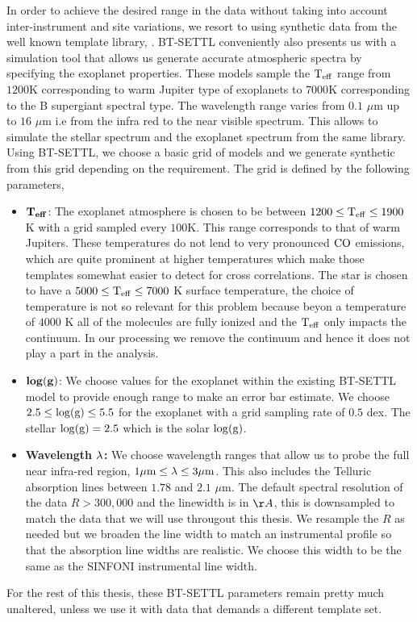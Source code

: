 In order to achieve the desired range in the data without taking into account inter-instrument and site variations, we resort to using synthetic data from the well known template library, \citep[\textsc{BT-SETTL},][]{1997Allard,2011Allard}.
\textsc{BT-SETTL} conveniently also presents us with a simulation tool \citep[\textsc{PHOENIX},][]{2011Allard} that allows us generate accurate atmospheric spectra by specifying the exoplanet properties.
These models sample the $\rm{T_{eff}}$ range from $1200$K corresponding to warm Jupiter type of exoplanets to $7000$K corresponding to the B supergiant spectral type.
The wavelength range varies from $0.1$ $\mu$m up to $16$ $\mu$m i.e from the infra red to the near visible spectrum. 
This allows to simulate the stellar spectrum and the exoplanet spectrum from the same library.
Using BT-SETTL, we choose a basic grid of models and we generate synthetic from this grid depending on the requirement.
The grid is defined by the following parameters,
\begin{itemize}
    \item[] $\rm{\mathbf{T_{eff}}}$: The exoplanet atmosphere is chosen to be between $1200\le \rm{T_{eff}}\le 1900$ K with a grid sampled every $100$K. 
    This range corresponds to that of warm Jupiters. 
    These temperatures do not lend to very pronounced $\rm{CO}$ emissions, which are quite prominent at higher temperatures which make those templates somewhat easier to detect for cross correlations. 
    The star is chosen to have a $5000\le \rm{T_{eff}}\le 7000$ K surface temperature, the choice of temperature is not so relevant for this problem because beyon a temperature of $4000$ K all of the molecules are fully ionized and the $\rm{T_{eff}}$ only impacts the continuum. 
    In our processing we remove the continuum and hence it does not play a part in the analysis.
    \item []$\rm{\mathbf{log(g)}}$: We choose values for the exoplanet within the existing BT-SETTL model to provide enough range to make an error bar estimate. 
    We choose $2.5\le \rm{\log(g)} \le 5.5$ for the exoplanet with a grid sampling rate of $0.5$ dex. 
    The stellar $\rm{\log(g)} = 2.5$ which is the solar $\rm{\log(g)}$.
    \item []\textbf{Wavelength $\rm{\mathbf{\lambda}}$:} We choose wavelength ranges that allow us to probe the full near infra-red region, $1 \mu\rm{m} \le \lambda \le 3 \mu \rm{m}$.
    This also includes the Telluric absorption lines between $1.78$ and $2.1$ $\mu$m.
    The default spectral resolution of the data $R>300,000$ and the linewidth is in $\AA$, this is downsampled to match the data that we will use througout this thesis.
    We resample the $R$ as needed but we broaden the line width to match an instrumental profile so that the absorption line widths are realistic.
    We choose this width to be the same as the SINFONI instrumental line width.
\end{itemize}
For the rest of this thesis, these \textsc{BT-SETTL} parameters remain pretty much unaltered, unless we use it with data that demands a different template set.

